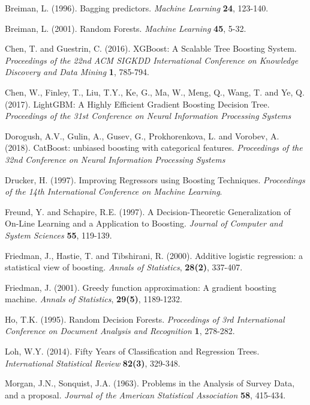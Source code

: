 \documentclass[12pt,twoside]{article}
\begin{document}
\newpage
{}
\begin{thebibliography}{100}
 Breiman, L. (1996). Bagging predictors. \textit{Machine Learning} \textbf{24}, 123-140.

 Breiman, L. (2001). Random Forests. \textit{Machine Learning} \textbf{45}, 5-32.

 Chen, T. and Guestrin, C. (2016). XGBoost: A Scalable Tree Boosting System. \textit{Proceedings of the 22nd ACM SIGKDD International Conference on Knowledge Discovery and Data Mining} \textbf{1}, 785-794.

 Chen, W., Finley, T., Liu, T.Y., Ke, G., Ma, W., Meng, Q., Wang, T. and Ye, Q. (2017). LightGBM: A Highly Efficient Gradient Boosting Decision Tree. \textit{Proceedings of the 31st Conference on Neural Information Processing Systems}

 Dorogush, A.V., Gulin, A., Gusev, G., Prokhorenkova, L. and Vorobev, A. (2018). CatBoost: unbiased boosting with categorical features. \textit{Proceedings of the 32nd Conference on Neural Information Processing Systems}

 Drucker, H. (1997). Improving Regressors using Boosting Techniques. \textit{Proceedings of the 14th International Conference on Machine Learning}.

 Freund, Y. and Schapire, R.E. (1997). A Decision-Theoretic Generalization of On-Line Learning and a Application to Boosting. \textit{Journal of Computer and System Sciences} \textbf{55}, 119-139.

 Friedman, J., Hastie, T. and Tibshirani, R. (2000). Additive logistic regression: a statistical view of boosting. \textit{Annals of Statistics}, \textbf{28(2)}, 337-407.

 Friedman, J. (2001). Greedy function approximation: A gradient boosting machine. \textit{Annals of Statistics}, \textbf{29(5)}, 1189-1232.

 Ho, T.K. (1995). Random Decision Forests. \textit{Proceedings of 3rd International Conference on Document Analysis and Recognition} \textbf{1}, 278-282.

 Loh, W.Y. (2014). Fifty Years of Classification and Regression Trees. \textit{International Statistical Review}
\textbf{82(3)}, 329-348.

 Morgan, J.N., Sonquist, J.A. (1963). Problems in the Analysis of Survey Data, and a proposal. \textit{Journal of the American Statistical Association} \textbf{58}, 415-434.




\end{thebibliography}
\end{document}
